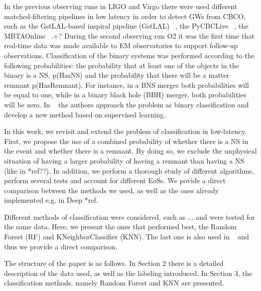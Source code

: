 
 
In the previous observing runs in LIGO and Virgo there were used different matched-filtering pipelines in low latency in order to detect GWs from CBCO, such as the GstLAL-based inspiral pipeline (GstLAL) ~\cite{Sachdev:2020lfd}, the PyCBCLive ~\cite{Nitz_2018}, the MBTAOnline ~\cite{Adams_2016}.+? During the second observing run O2 it was the first time that real-time data was made available to EM observatories to support follow-up observations. Classification of the binary systems was performed according to the following probabilities: the probability that at least one of the objects in the binary is a NS, p(HasNS) and the probability that there will be a matter remnant p(HasRemnant). For instance, in a BNS merger both probabilities will be equal to one, while in a binary black hole (BBH) merger, both probabilities will be zero. In ~\cite{Chatterjee:2019avs} the authors approach the problem as binary classification and develop a new method based on supervised learning. 


In this work, we revisit and extend the problem of classification in low-latency. First, we propose the use of a combined probability of whether there is a NS in the event and whether there is a remnant. By doing so, we exclude the unphysical situation of having a larger probability of having a remnant than having a NS (like in *ref??). In addition, we perform a thorough study of different algorithms, perform several tests and account for different EoSs. We povide a direct comparison between the methods we used, as well as the ones already implemented e.g. in Deep *ref. 

Different methods of classification were considered, such as ... and were tested for the same data. Here, we present the ones that performed best, the Random Forest (RF) and KNeighborClassifier (KNN). The last one is also used in ~\cite{Chatterjee:2019avs} and thus we provide a direct comparison. 

The structure of the paper is as follows. In Section 2 there is a detailed description of the data used, as well as the labeling introduced. In Section 3, the classification methods, namely Random Forest and KNN are presented. 
